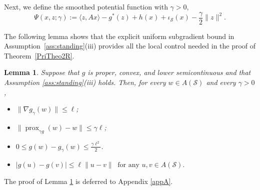 \documentclass[11pt]{article}
\numberwithin{equation}{section}
\newtheorem{lemma}[theorem]{Lemma}
\newtheorem{remark}[theorem]{Remark}
\newcommand{\R}{\mathbb{R}}
\newcommand{\prox}{\operatorname{prox}}
\begin{document}

\noindent Next, we define the smoothed potential function with $\gamma>0$,
\begin{equation}\label{eq:Psi}
\Psi(x,z;\gamma)
:=
\langle z,Ax\rangle-g^*(z)+h(x)+\iota_{\mathcal S}(x)
-\frac{\gamma}{2}\|z\|^2 .
\end{equation}




The following lemma shows that the explicit uniform subgradient bound in Assumption~\ref{ass:standing}(iii) provides all the local control needed in the proof of Theorem~\ref{PriTheo2R}.
\begin{lemma}
\label{lem:uniform-moreau-estimates}
Suppose that $g$ is proper, convex, and lower semicontinuous and that Assumption \ref{ass:standing}(iii) holds.
Then, for every $w\in A(\mathcal S)$ and every $\gamma>0$,
\begin{itemize}
\item[(i)]
$\|\nabla g_\gamma(w)\|\leq\ell$;
\label{eq:uniform-gradient-bound}
\item[(ii)]
$
\|\prox_{\gamma g}(w)-w\|\leq\gamma\ell$;
\label{eq:uniform-proximal-bound}
\item[(iii)]
$0\leq g(w)-g_\gamma(w)\leq\frac{\gamma\ell^2}{2}$.

\item[(iv)]
$|g(u)-g(v)|\leq\ell\|u-v\|
\;\;\text{for any }u,v\in A(\mathcal S).$
\end{itemize}
\end{lemma}
The proof of Lemma \ref{lem:uniform-moreau-estimates} is deferred to Appendix \ref{appA}.
\end{document}
